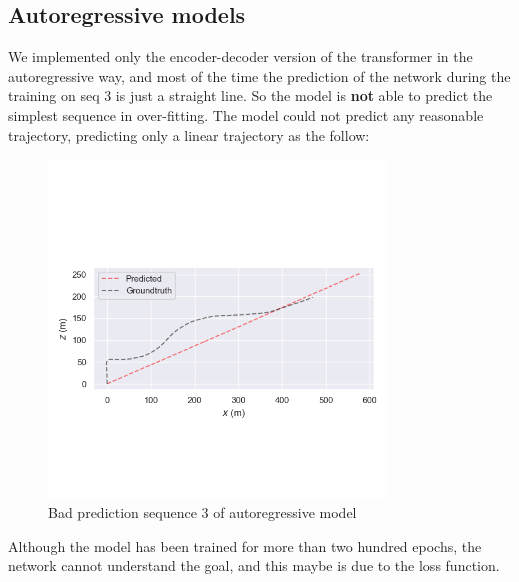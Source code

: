 \subsection{Autoregressive models}\label{subsec:autoregressive-model}
We implemented only the encoder-decoder version of the transformer in the autoregressive way, and most of the time the prediction of the network during the training on seq 3 is just a straight line.
So the model is \textbf{not} able to predict the simplest sequence in over-fitting.
The model could not predict any reasonable trajectory, predicting only a linear trajectory as the follow:
\begin{figure}[H]
    \centering
    \includegraphics[width=0.8\textwidth]{images/1_4_autoregressive_prediction}
    \caption{Bad prediction sequence 3 of autoregressive model}\label{fig:autoregressive-seq-3}
\end{figure}
Although the model has been trained for more than two hundred epochs, the network cannot understand the goal, and this maybe is due to the loss function.